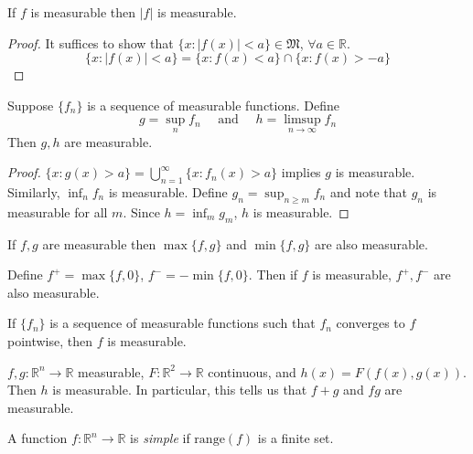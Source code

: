 \documentclass[11pt]{article}
\begin{document}
\begin{theorem}
    If $f$ is measurable then $|f|$ is measurable. 
\end{theorem}
\begin{proof}
    It suffices to show that $\{ x : |f(x)| < a \} \in \mathfrak{M}$, $\forall a \in \mathbb{R}$. $$\{ x : |f(x)  | < a \} = \{ x : f(x) < a \} \cap \{ x : f(x) > -a \}$$
\end{proof}

\begin{theorem}
     Suppose $\{ f_n \}$ is a sequence of measurable functions. Define $$g = \sup_n f_n \quad \text{ and } \quad h = \limsup_{n \to \infty} f_n$$ Then $g, h$ are measurable. 
\end{theorem}
\begin{proof}
    $\{ x : g(x) > a \} = \bigcup_{n = 1}^\infty \{ x : f_n(x) > a \} $ implies $ g$ is measurable. Similarly, $\inf_n f_n$ is measurable. Define $g_n = \sup_{n \ge m} f_n$ and note that $g_n$ is measurable for all $m$. Since $h = \inf_m g_m$, $h$ is measurable. 
\end{proof}

\begin{corollary}
     If $f, g$ are measurable then $\max\{ f, g \}$ and $\min \{ f, g \}$ are also measurable.
\end{corollary}

\begin{corollary}
    Define $f^+ = \max \{ f, 0 \}$, $f^- = - \min \{ f, 0 \}$. Then if $f$ is measurable, $f^+, f^-$ are also measurable.
\end{corollary}

\begin{corollary}
    If $\{ f_n \}$ is a sequence of measurable functions such that $f_n$ converges to $f$ pointwise, then $f$ is measurable. 
\end{corollary}

\begin{theorem}
    $f, g: \mathbb{R}^n \to \mathbb{R}$ measurable, $F: \mathbb{R}^2 \to \mathbb{R}$ continuous, and $h(x) = F(f(x), g(x))$. Then $h$ is measurable. In particular, this tells us that $f + g$ and $fg$ are measurable. 
\end{theorem}

\begin{definition}
    A function $f: \mathbb{R}^n \to \mathbb{R}$ is \emph{simple} if $\mathrm{range}(f)$ is a finite set.
\end{definition}
\end{document}
